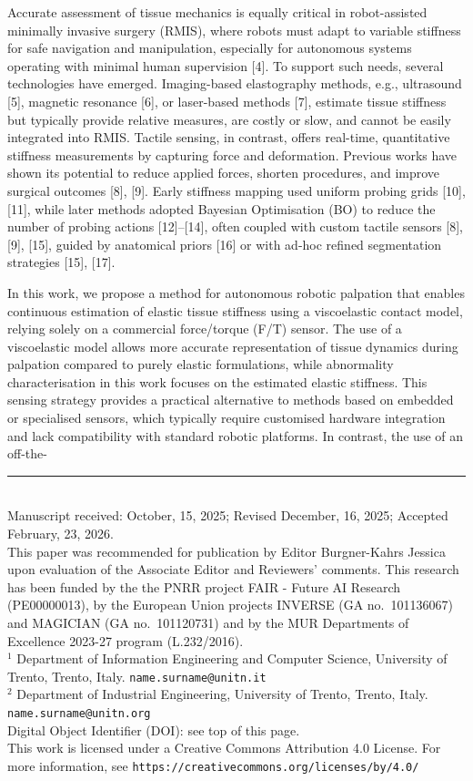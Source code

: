 \documentclass[11pt]{article}
\begin{document}
Accurate assessment of tissue mechanics is equally critical in
robot-assisted minimally invasive surgery (RMIS), where robots must
adapt to variable stiffness for safe navigation and manipulation,
especially for autonomous systems operating with minimal human
supervision [4]. To support such needs, several technologies have
emerged. Imaging-based elastography methods, e.g., ultrasound [5],
magnetic resonance [6], or laser-based methods [7], estimate tissue
stiffness but typically provide relative measures, are costly or slow,
and cannot be easily integrated into RMIS. Tactile sensing, in
contrast, offers real-time, quantitative stiffness measurements by
capturing force and deformation. Previous works have shown its
potential to reduce applied forces, shorten procedures, and improve
surgical outcomes [8], [9]. Early stiffness mapping used uniform
probing grids [10], [11], while later methods adopted Bayesian
Optimisation (BO) to reduce the number of probing actions [12]--[14],
often coupled with custom tactile sensors [8], [9], [15], guided by
anatomical priors [16] or with ad-hoc refined segmentation strategies
[15], [17].

In this work, we propose a method for autonomous robotic palpation
that enables continuous estimation of elastic tissue stiffness using
a viscoelastic contact model, relying solely on a commercial
force/torque (F/T) sensor. The use of a viscoelastic model allows
more accurate representation of tissue dynamics during palpation
compared to purely elastic formulations, while abnormality
characterisation in this work focuses on the estimated elastic
stiffness. This sensing strategy provides a practical alternative to
methods based on embedded or specialised sensors, which typically
require customised hardware integration and lack compatibility with
standard robotic platforms. In contrast, the use of an off-the-

\vspace{1em}

\noindent\rule{0.4\textwidth}{0.4pt}\\[4pt]
{\footnotesize
Manuscript received: October, 15, 2025; Revised December, 16, 2025;
Accepted February, 23, 2026.\\[2pt]
This paper was recommended for publication by Editor Burgner-Kahrs
Jessica upon evaluation of the Associate Editor and Reviewers'
comments. This research has been funded by the the PNRR project
FAIR - Future AI Research (PE00000013), by the European Union
projects INVERSE (GA no.~101136067) and MAGICIAN (GA no.~101120731)
and by the MUR Departments of Excellence 2023-27 program
(L.232/2016).\\[2pt]
$^{1}$ Department of Information Engineering and Computer Science,
University of Trento, Trento, Italy. \texttt{name.surname@unitn.it}\\[2pt]
$^{2}$ Department of Industrial Engineering, University of Trento,
Trento, Italy. \texttt{name.surname@unitn.org}\\[2pt]
Digital Object Identifier (DOI): see top of this page.\\[6pt]
This work is licensed under a Creative Commons Attribution 4.0
License. For more information, see
\texttt{https://creativecommons.org/licenses/by/4.0/}
}
\end{document}
